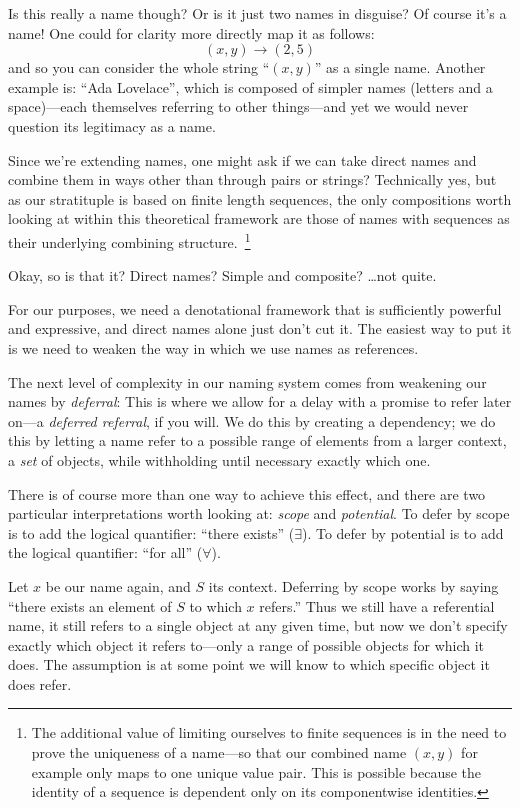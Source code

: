\documentclass[twoside]{article}
\begin{document}
Is this really a name though? Or is it just two names in disguise?
Of course it's a name! One could for clarity more directly map it as follows:
$$ (x, y)\to (2, 5) $$
and so you can consider the whole string ``$ (x, y) $'' as a single name. Another example is:
``Ada Lovelace'', which is composed of simpler names (letters and a space)---each themselves
referring to other things---and yet we would never question its legitimacy as a name.

Since we're extending names, one might ask if we can take direct names and combine them in ways other than through
pairs or strings? Technically yes, but as our stratituple is based on finite length sequences, the only compositions
worth looking at within this theoretical framework are those of names with sequences as their underlying combining
structure.~\footnote{The additional value of limiting ourselves to finite sequences is in the need to prove
the uniqueness of a name---so that our combined name $ (x, y) $ for example only maps to one unique value pair.
This is possible because the identity of a sequence is dependent only on its componentwise identities.}

Okay, so is that it? Direct names? Simple and composite? \ldots not quite.

For our purposes, we need a denotational framework that is sufficiently powerful and expressive, and direct names
alone just don't cut it. The easiest way to put it is we need to weaken the way in which we use names as references.

The next level of complexity in our naming system comes from weakening our names by \emph{deferral}:
This is where we allow for a delay with a promise to refer later on---a \emph{deferred referral}, if you will.
We do this by creating a dependency; we do this by letting a name refer to a possible range of elements from
a larger context, a \emph{set} of objects, while withholding until necessary exactly which one.

There is of course more than one way to achieve this effect, and there are two particular interpretations worth looking at:
\emph{scope} and \emph{potential}. To defer by scope is to add the logical quantifier: ``there exists'' ($ \exists $).
To defer by potential is to add the logical quantifier: ``for all'' ($ \forall $).

Let $ x $ be our name again, and $ S $ its context. Deferring by scope works by saying ``there exists an element of
$ S $ to which $ x $ refers.'' Thus we still have a referential name, it still refers to a single object at any given
time, but now we don't specify exactly which object it refers to---only a range of possible objects for which it does.
The assumption is at some point we will know to which specific object it does refer.
\end{document}
